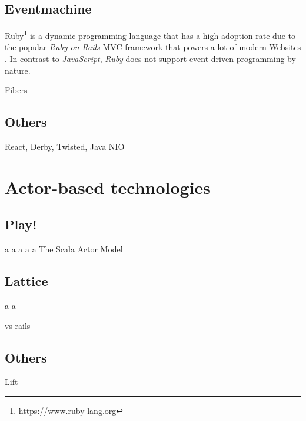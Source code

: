\subsection{Eventmachine}
Ruby\footnote{\url{https://www.ruby-lang.org}} is a dynamic programming language that has a high adoption rate due to the popular \textit{Ruby on Rails} MVC framework that powers a lot of modern Websites \cite[p. 11]{Orsini2008}. In contrast to \textit{JavaScript}, \textit{Ruby} does not support event-driven programming by nature.


Fibers


\subsection{Others}
React, Derby, Twisted, Java NIO

\section{Actor-based technologies}

\subsection{Play!} \newpage a \newpage a \newpage a \newpage a \newpage a
The Scala Actor Model


\subsection{Lattice} \newpage a \newpage a

vs rails

\subsection{Others}
Lift











































